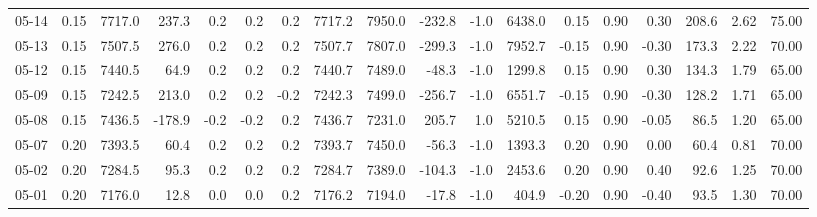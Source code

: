 \begin{threeparttable}
{\begin{tabular}{lrrrrrrrrrrrrrrrrr}
  05-14 &     0.15 & 7717.0 &             237.3 &               0.2 &                0.2 &                0.2 & 7717.2 & 7950.0 &     -232.8 &                     -1.0 &              6438.0 &       0.15 &      0.90 &           0.30 &            208.6 &            2.62 &                  75.00 \\
  05-13 &     0.15 & 7507.5 &             276.0 &               0.2 &                0.2 &                0.2 & 7507.7 & 7807.0 &     -299.3 &                     -1.0 &              7952.7 &      -0.15 &      0.90 &          -0.30 &            173.3 &            2.22 &                  70.00 \\
  05-12 &     0.15 & 7440.5 &              64.9 &               0.2 &                0.2 &                0.2 & 7440.7 & 7489.0 &      -48.3 &                     -1.0 &              1299.8 &       0.15 &      0.90 &           0.30 &            134.3 &            1.79 &                  65.00 \\
  05-09 &     0.15 & 7242.5 &             213.0 &               0.2 &                0.2 &               -0.2 & 7242.3 & 7499.0 &     -256.7 &                     -1.0 &              6551.7 &      -0.15 &      0.90 &          -0.30 &            128.2 &            1.71 &                  65.00 \\
  05-08 &     0.15 & 7436.5 &            -178.9 &              -0.2 &               -0.2 &                0.2 & 7436.7 & 7231.0 &      205.7 &                      1.0 &              5210.5 &       0.15 &      0.90 &          -0.05 &             86.5 &            1.20 &                  65.00 \\
  05-07 &     0.20 & 7393.5 &              60.4 &               0.2 &                0.2 &                0.2 & 7393.7 & 7450.0 &      -56.3 &                     -1.0 &              1393.3 &       0.20 &      0.90 &           0.00 &             60.4 &            0.81 &                  70.00 \\
  05-02 &     0.20 & 7284.5 &              95.3 &               0.2 &                0.2 &                0.2 & 7284.7 & 7389.0 &     -104.3 &                     -1.0 &              2453.6 &       0.20 &      0.90 &           0.40 &             92.6 &            1.25 &                  70.00 \\
  05-01 &     0.20 & 7176.0 &              12.8 &               0.0 &                0.0 &                0.2 & 7176.2 & 7194.0 &      -17.8 &                     -1.0 &               404.9 &      -0.20 &      0.90 &          -0.40 &             93.5 &            1.30 &                  70.00 \\

\end{tabular}}
\end{threeparttable}
